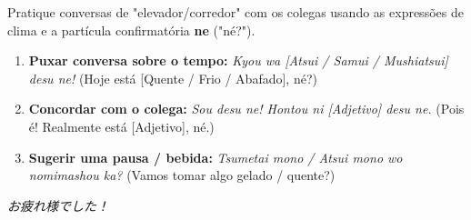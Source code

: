 \documentclass[12pt,a4paper]{article}
\begin{document}
\vspace{0.5cm}

\begin{tcolorbox}[colback=jpred!5, colframe=jpred, title=\textbf{Dinâmica em Grupo}, fonttitle=\bfseries]
\small
Pratique conversas de "elevador/corredor" com os colegas usando as expressões de clima e a partícula confirmatória \textbf{ne} ("né?").

\vspace{0.2cm}

\begin{enumerate}[leftmargin=*]
    \item \textbf{Puxar conversa sobre o tempo:} \textit{Kyou wa [Atsui / Samui / Mushiatsui] desu ne!} (Hoje está [Quente / Frio / Abafado], né?)
    \item \textbf{Concordar com o colega:} \textit{Sou desu ne! Hontou ni [Adjetivo] desu ne.} (Pois é! Realmente está [Adjetivo], né.)
    \item \textbf{Sugerir uma pausa / bebida:} \textit{Tsumetai mono / Atsui mono wo nomimashou ka?} (Vamos tomar algo gelado / quente?)
\end{enumerate}
\end{tcolorbox}

\vspace{0.4cm}

\begin{center}
    \small\color{gray} \textit{お疲れ様でした！}
\end{center}
\end{document}
